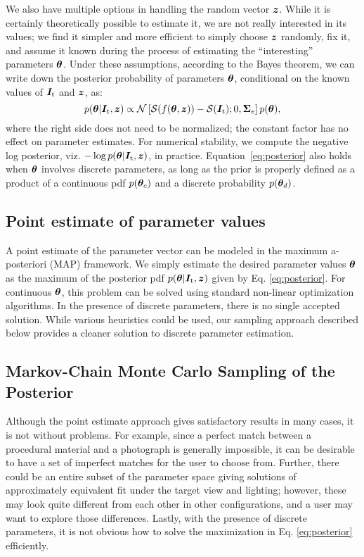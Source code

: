 We also have multiple options in handling the random vector $\bm{z}$. While it is certainly theoretically possible to estimate it, we are not really interested in its values;  we find it simpler and more efficient to simply choose $\bm{z}$ randomly, fix it, and assume it known during the process of estimating the ``interesting'' parameters $\bm\theta$.
Under these assumptions, according to the Bayes theorem, we can write down the posterior probability of parameters $\bm\theta$, conditional on the known values of $\bm{I}_\mathrm{t}$ and $\bm{z}$, as:
\begin{equation} 
	\label{eq:posterior}
	p(\bm\theta | \bm{I}_\mathrm{t}, \bm{z}) \propto \mathcal{N}\left[\mathcal{S}(f(\bm\theta, \bm{z})) - \mathcal{S}(\bm{I}_\mathrm{t}); 0, \bm\Sigma_e\right] p(\bm\theta),
\end{equation}
where the right side does not need to be normalized; the constant factor has no effect on parameter estimates.
For numerical stability, we compute the negative log posterior, viz. $-\log p(\bm\theta | \bm{I}_\mathrm{t}, \bm{z})$, in practice. Equation~\eqref{eq:posterior} also holds when $\bm\theta$ involves discrete parameters, as long as the prior is properly defined as a product of a continuous pdf $p(\bm\theta_c)$ and a discrete probability $p(\bm\theta_d)$.

\subsection{Point estimate of parameter values}

A point estimate of the parameter vector can be modeled in the maximum a-posteriori (MAP) framework. We simply estimate the desired parameter values $\bm\theta$ as the maximum of the posterior pdf $p(\bm\theta | \bm{I}_\mathrm{t}, \bm{z})$ given by Eq. \eqref{eq:posterior}. For continuous $\bm\theta$, this problem can be solved using standard non-linear optimization algorithms. In the presence of discrete parameters, there is no single accepted solution. While various heuristics could be used, our sampling approach described below provides a cleaner solution to discrete parameter estimation.

\subsection{Markov-Chain Monte Carlo Sampling of the Posterior}
\label{ssec:bayesian}

Although the point estimate approach gives satisfactory results in many cases, it is not without problems. For example, since a perfect match between a procedural material and a photograph is generally impossible, it can be desirable to have a set of imperfect matches for the user to choose from. Further, there could be an entire subset of the parameter space giving solutions of approximately equivalent fit under the target view and lighting; however, these may look quite different from each other in other configurations, and a user may want to explore those differences. Lastly, with the presence of discrete parameters, it is not obvious how to solve the maximization in Eq. \eqref{eq:posterior} efficiently.

